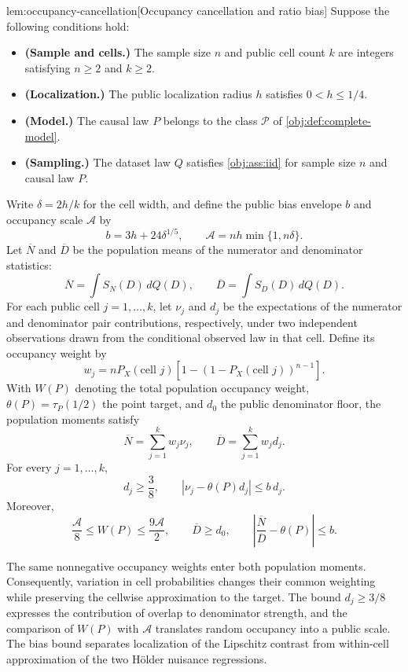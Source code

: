 \begin{lemmav}{lem:occupancy-cancellation}[Occupancy cancellation and ratio bias]
Suppose the following conditions hold:
\begin{itemize}
\item \textbf{(Sample and cells.)} The sample size \(n\) and public cell count \(k\) are integers satisfying \(n\ge 2\) and \(k\ge 2\).
\item \textbf{(Localization.)} The public localization radius \(h\) satisfies \(0<h\le 1/4\).
\item \textbf{(Model.)} The causal law \(P\) belongs to the class \(\mathcal P\) of \cref{obj:def:complete-model}.
\item \textbf{(Sampling.)} The dataset law \(Q\) satisfies \cref{obj:ass:iid} for sample size \(n\) and causal law \(P\).
\end{itemize}
Write \(\delta=2h/k\) for the cell width, and define the public bias envelope \(b\) and occupancy scale \(\mathcal A\) by
\[
b=3h+24\delta^{1/5},
\qquad
\mathcal A=nh\min\{1,n\delta\}.
\]
Let \(\overline N\) and \(\overline D\) be the population means of the numerator and denominator statistics:
\[
\overline N=\int S_N(D)\,dQ(D),
\qquad
\overline D=\int S_D(D)\,dQ(D).
\]
For each public cell \(j=1,\ldots,k\), let \(\nu_j\) and \(d_j\) be the expectations of the numerator and denominator pair contributions, respectively, under two independent observations drawn from the conditional observed law in that cell. Define its occupancy weight by
\[
w_j
=
nP_X(\text{cell }j)
\left[1-\left(1-P_X(\text{cell }j)\right)^{n-1}\right].
\]
With \(W(P)\) denoting the total population occupancy weight, \(\theta(P)=\tau_P(1/2)\) the point target, and \(d_0\) the public denominator floor, the population moments satisfy
\[
\overline N=\sum_{j=1}^{k}w_j\nu_j,
\qquad
\overline D=\sum_{j=1}^{k}w_jd_j.
\]
For every \(j=1,\ldots,k\),
\[
d_j\ge\frac38,
\qquad
\left|\nu_j-\theta(P)d_j\right|\le b\,d_j.
\]
Moreover,
\[
\frac{\mathcal A}{8}\le W(P)\le\frac{9\mathcal A}{2},
\qquad
\overline D\ge d_0,
\qquad
\left|\frac{\overline N}{\overline D}-\theta(P)\right|\le b.
\]
\end{lemmav}

The same nonnegative occupancy weights enter both population moments. Consequently, variation in cell probabilities changes their common weighting while preserving the cellwise approximation to the target. The bound \(d_j\ge3/8\) expresses the contribution of overlap to denominator strength, and the comparison of \(W(P)\) with \(\mathcal A\) translates random occupancy into a public scale. The bias bound separates localization of the Lipschitz contrast from within-cell approximation of the two Hölder nuisance regressions.

